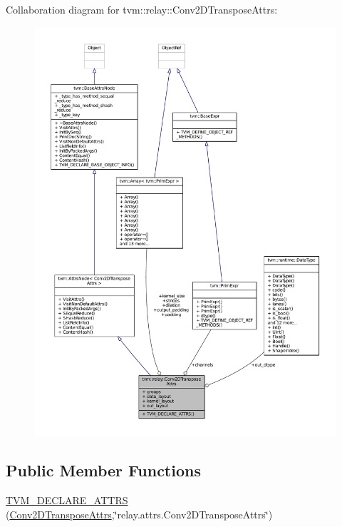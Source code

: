 Collaboration diagram for tvm\+:\+:relay\+:\+:Conv2\+D\+Transpose\+Attrs\+:
\nopagebreak
\begin{figure}[H]
\begin{center}
\leavevmode
\includegraphics[width=350pt]{structtvm_1_1relay_1_1Conv2DTransposeAttrs__coll__graph}
\end{center}
\end{figure}
\subsection*{Public Member Functions}
\begin{DoxyCompactItemize}
\item 
\hyperlink{structtvm_1_1relay_1_1Conv2DTransposeAttrs_a6a50c25b66ad09fb73c6bffad795c9ac}{T\+V\+M\+\_\+\+D\+E\+C\+L\+A\+R\+E\+\_\+\+A\+T\+T\+RS} (\hyperlink{structtvm_1_1relay_1_1Conv2DTransposeAttrs}{Conv2\+D\+Transpose\+Attrs},\char`\"{}relay.\+attrs.\+Conv2\+D\+Transpose\+Attrs\char`\"{})
\end{DoxyCompactItemize}
